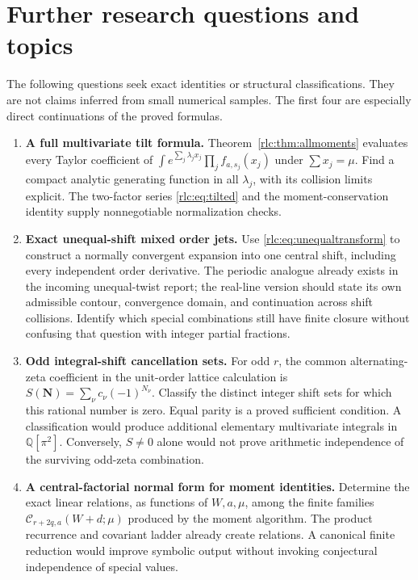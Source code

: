 \documentclass[11pt,a4paper]{article}
\numberwithin{equation}{section}
\theoremstyle{definition}\newtheorem{definition}[theorem]{Definition}
\theoremstyle{remark}\newtheorem{remark}[theorem]{Remark}
\newcommand{\CC}{\mathcal C}
\begin{document}


\section{Further research questions and topics}
\label{rlc:sec:research}

The following questions seek exact identities or structural
classifications. They are not claims inferred from small numerical
samples. The first four are especially direct continuations of the
proved formulas.

\begin{enumerate}[label=\textbf{Q\arabic*.},leftmargin=2.8em,itemsep=8pt]
\item \textbf{A full multivariate tilt formula.}
Theorem~\ref{rlc:thm:allmoments} evaluates every Taylor coefficient of
$\int e^{\sum_j\lambda_jx_j}\prod_jf_{a,s_j}(x_j)$ under
$\sum x_j=\mu$. Find a compact analytic generating function in all
$\lambda_j$, with its collision limits explicit. The two-factor
series \eqref{rlc:eq:tilted} and the moment-conservation identity supply
nonnegotiable normalization checks.

\item \textbf{Exact unequal-shift mixed order jets.}
Use \eqref{rlc:eq:unequaltransform} to construct a normally convergent
expansion into one central shift, including every independent order
derivative. The periodic analogue already exists in the incoming
unequal-twist report; the real-line version should state its own
admissible contour, convergence domain, and continuation across shift
collisions. Identify which special combinations still have finite
closure without confusing that question with integer partial fractions.

\item \textbf{Odd integral-shift cancellation sets.}
For odd $r$, the common alternating-zeta coefficient in the unit-order
lattice calculation is
$S(\boldsymbol N)=\sum_\nu c_\nu(-1)^{N_\nu}$.
Classify the distinct integer shift sets for which this rational number
is zero. Equal parity is a proved sufficient condition. A classification
would produce additional elementary multivariate integrals in
$\mathbb Q[\pi^2]$. Conversely, $S\ne0$ alone would not prove arithmetic
independence of the surviving odd-zeta combination.

\item \textbf{A central-factorial normal form for moment identities.}
Determine the exact linear relations, as functions of $W,a,\mu$, among
the finite families $\CC_{r+2q,a}(W+d;\mu)$ produced by the moment
algorithm. The product recurrence and covariant ladder already create
relations. A canonical finite reduction would improve symbolic output
without invoking conjectural independence of special values.


\end{enumerate}
\end{document}

